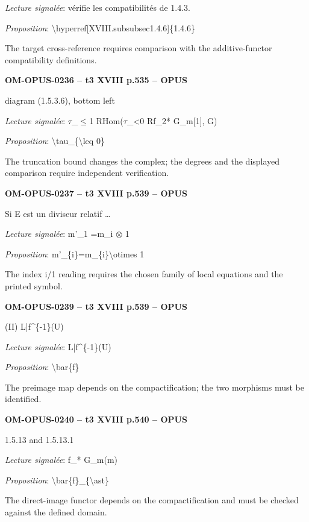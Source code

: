 \emph{Lecture signalée}: vérifie les compatibilités de 1.4.3.\par
\emph{Proposition}: \textbackslash{}hyperref[XVIII.subsubsec1.4.6]\{1.4.6\}\par
The target cross-reference requires comparison with the additive-functor compatibility definitions.\par
\par\noindent\textbf{OM-OPUS-0236 -- t3 XVIII p.535 -- OPUS}\par
diagram (1.5.3.6), bottom left\par
\emph{Lecture signalée}: \ensuremath{\tau}\_\ensuremath{\leq}1 RHom(\ensuremath{\tau}\_<0 Rf\_2* G\_m[1], G)\par
\emph{Proposition}: \textbackslash{}tau\_\{\textbackslash{}leq 0\}\par
The truncation bound changes the complex; the degrees and the displayed comparison require independent verification.\par
\par\noindent\textbf{OM-OPUS-0237 -- t3 XVIII p.539 -- OPUS}\par
Si E est un diviseur relatif …\par
\emph{Lecture signalée}: m'\_1 =\allowbreak  m\_i \ensuremath{\otimes} 1\par
\emph{Proposition}: m'\_\{i\}=\allowbreak m\_\{i\}\textbackslash{}otimes 1\par
The index i/1 reading requires the chosen family of local equations and the printed symbol.\par
\par\noindent\textbf{OM-OPUS-0239 -- t3 XVIII p.539 -- OPUS}\par
(II) L|f\textasciicircum{}\{-1\}(U)\par
\emph{Lecture signalée}: L|f\textasciicircum{}\{-1\}(U)\par
\emph{Proposition}: \textbackslash{}bar\{f\}\par
The preimage map depends on the compactification; the two morphisms must be identified.\par
\par\noindent\textbf{OM-OPUS-0240 -- t3 XVIII p.540 -- OPUS}\par
1.5.13 and 1.5.13.1\par
\emph{Lecture signalée}: f\_* G\_m(m)\par
\emph{Proposition}: \textbackslash{}bar\{f\}\_\{\textbackslash{}ast\}\par
The direct-image functor depends on the compactification and must be checked against the defined domain.\par
